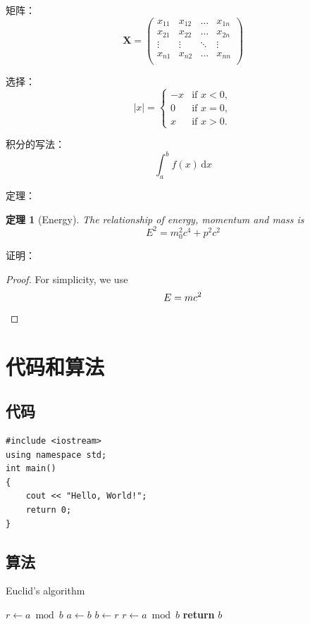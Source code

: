 \documentclass[a4paper]{article} %
\numberwithin{equation}{section} %
\newcommand{\ud}{\,\mathrm{d}}
\newtheorem{Theorem}{定理}
\begin{document}
矩阵：
\begin{equation}
\mathbf X = 
\begin{pmatrix}
x_{11} & x_{12} & \ldots & x_{1n}\\
x_{21} & x_{22} & \ldots & x_{2n}\\
\vdots & \vdots & \ddots & \vdots\\
x_{n1} & x_{n2} & \ldots & x_{nn}\\
\end{pmatrix}
\end{equation}

选择：
\begin{equation}
|x| =
\begin{cases}
-x & \text{if } x < 0,\\
0 & \text{if } x = 0,\\
x & \text{if } x > 0.
\end{cases}
\end{equation}

积分的写法：
\begin{equation}
\int_a^b f(x)\ud x
\end{equation}

定理：
\begin{Theorem}[Energy]
The relationship of energy,
momentum and mass is
\begin{equation}
E^2 = m_0^2 c^4 + p^2 c^2
\end{equation}
\end{Theorem}

证明\cite[page 48]{lshort}：
\begin{proof}
For simplicity, we use
\[
E=mc^2 \qedhere
\]
\end{proof}

\section{代码和算法}
\subsection{代码}
\begin{verbatim}
#include <iostream>
using namespace std;
int main() 
{
    cout << "Hello, World!";
    return 0;
}
\end{verbatim}

\subsection{算法}
\begin{algorithm}[H]
\caption{Euclid’s algorithm}\label{alg:euclid}
\begin{algorithmic}[1] %
\State $r\gets a\bmod b$
\State $a\gets b$
\State $b\gets r$
\State $r\gets a\bmod b$
\EndWhile\label{alg:euclidendwhile}
\State \textbf{return} $b$
\EndProcedure
\end{algorithmic}
\end{algorithm}
\end{document}
